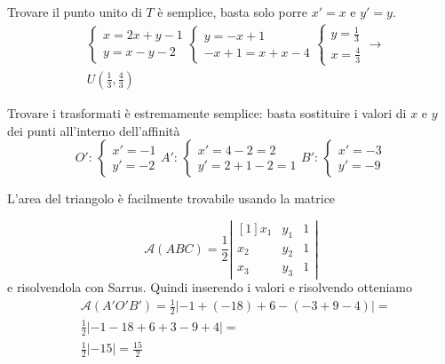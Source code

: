 Trovare il punto unito di $T$ è semplice, basta solo porre $x'=x$ e $y'=y$.
\begin{align*}
  &\begin{cases}
  x=2x+y-1\\
  y=x-y-2
\end{cases}
\begin{cases}
  y = -x+1\\
  -x+1=x+x-4
\end{cases}
\begin{cases}
  y=\frac{1}{3}\\
  x=\frac{4}{3}
\end{cases}\rightarrow \\&U\left(\frac{1}{3},\frac{4}{3}\right)
\end{align*}

Trovare i trasformati è estremamente semplice: basta sostituire i valori di $x$ e $y$ dei punti
all'interno dell'affinità
\begin{equation*}
  \boxed{
    O':\,\begin{cases}
      x'=-1\\y'=-2
    \end{cases}
    A':\,\begin{cases}
      x'=4-2=2\\
      y'=2+1-2=1
    \end{cases}
    B':\,\begin{cases}
      x'=-3\\
      y'=-9
    \end{cases}
  }	
\end{equation*}

L'area del triangolo è facilmente trovabile usando la matrice

\begin{equation*}
  \mathscr{A}(ABC) = \frac{1}{2}\left\lvert 
    \begin{matrix}[1]
      x_1 & y_1 & 1\\
      x_2 & y_2 & 1\\
      x_3 & y_3 & 1
  \end{matrix}\right\rvert
\end{equation*}
e risolvendola con Sarrus. Quindi inserendo i valori e risolvendo otteniamo
\begin{align*}
  &\mathscr{A}(A'O'B') = \frac{1}{2}\left\lvert 
  -1+(-18)+6-(-3+9-4)\right\rvert = \\&\frac{1}{2}\left\lvert 
-1-18+6+3-9+4\right\rvert = \\&\frac{1}{2}\left\lvert-15\right\rvert = \boxed{\frac{15}{2}}
\end{align*}

